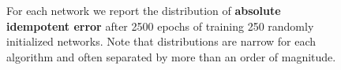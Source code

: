 \documentclass{article}
\theoremstyle{plain}
\theoremstyle{definition}
\theoremstyle{remark}
\begin{document}
\begin{figure}[H]
    \centering
    \caption{For each network we report the distribution of \textbf{absolute idempotent error} after 2500 epochs of training 250 randomly initialized networks. Note that distributions are narrow for each algorithm and often separated by more than an order of magnitude.}
    \label{fig:error-test-nets}
\end{figure}
\end{document}
